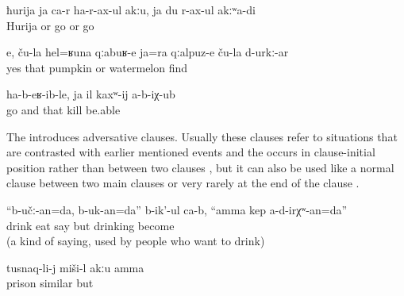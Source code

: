 \begin{exe}
	\ex	\label{ex:‎Neither Xurija herself comes nor do I go minor}
	\gll	ħurija	ja	ca-r	ha-r-ax-ul	akːu,	ja	du	r-ax-ul	akːʷa-di\\
		Hurija	or		go		or		go	\\
	\glt	{}

	\ex	\label{ex:‎These are probably their pumpkins or watermelons minor}
	\gll	e,	ču-la	hel=ʁuna	qːabuʁ-e	ja=ra	qːalpuz-e	ču-la	d-urkː-ar\\
		yes		that	pumpkin	or	watermelon		find\\
	\glt	{}

	\ex	\label{ex:They went and they could not kill him minor}
	\gll	ha-b-eʁ-ib-le,	ja	il	kaxʷ-ij	a-b-iχ-ub\\
		go	and	that	kill	be.able\\
	\glt	{}
\end{exe}

The    introduces adversative clauses. Usually these clauses refer to situations that are contrasted with earlier mentioned events and the  occurs in clause-initial position rather than between two clauses , but it can also be used like a normal clause  between two main clauses  or very rarely at the end of the clause .

\begin{exe}
	\ex	\label{ex:‎They say, We will drink and eat, but not until we become drunk minor}
	\gll	``b-učː-an=da,	b-uk-an=da''	b-ik'-ul	ca-b,	``amma	kep	a-d-irχʷ-an=da''\\
		drink	eat	say		but	drinking	become\\
	\glt	{} (a kind of saying, used by people who want to drink)

	\ex	\label{ex:‎But isn't this similar to a prison minor}
	\gll	tusnaq-li-j	miši-l	akːu	amma\\
		prison	similar		but\\
	\glt	{}
\end{exe}

